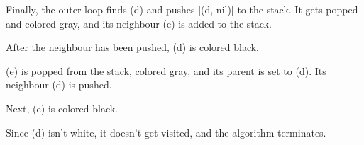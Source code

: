 \documentclass[a4paper]{article}
\begin{document}
Finally, the outer loop finds (d) and pushes \code|(d, nil)| to the stack. It gets popped and colored gray, and its neighbour (e) is added to the stack.


After the neighbour has been pushed, (d) is colored black.


(e) is popped from the stack, colored gray, and its parent is set to (d). Its neighbour (d) is pushed.


Next, (e) is colored black.


Since (d) isn't white, it doesn't get visited, and the algorithm terminates.
\end{document}
